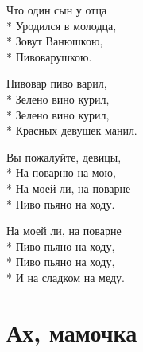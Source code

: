 \medskip

\begin{minipage}{\linewidth}
Что один сын у отца\\*
Уродился в молодца,\\*
Зовут Ванюшкою,\\*
Пивоварушкою.\\
\end{minipage}\par\medskip\nobreak

\medskip

\begin{minipage}{\linewidth}
Пивовар пиво варил,\\*
Зелено вино курил,\\*
Зелено вино курил,\\*
Красных девушек манил.\\
\end{minipage}\par\medskip\nobreak

\medskip

\begin{minipage}{\linewidth}
Вы пожалуйте, девицы,\\*
На поварню на мою,\\*
На моей ли, на поварне\\*
Пиво пьяно на ходу.\\
\end{minipage}\par\medskip\nobreak

\medskip

\begin{minipage}{\linewidth}
На моей ли, на поварне\\*
Пиво пьяно на ходу,\\*
Пиво пьяно на ходу,\\*
И на сладком на меду.\\
\end{minipage}

\vspace{\fill}\newpage

\section{Ах, мамочка}
\label{song:Ах,_мамочка}

